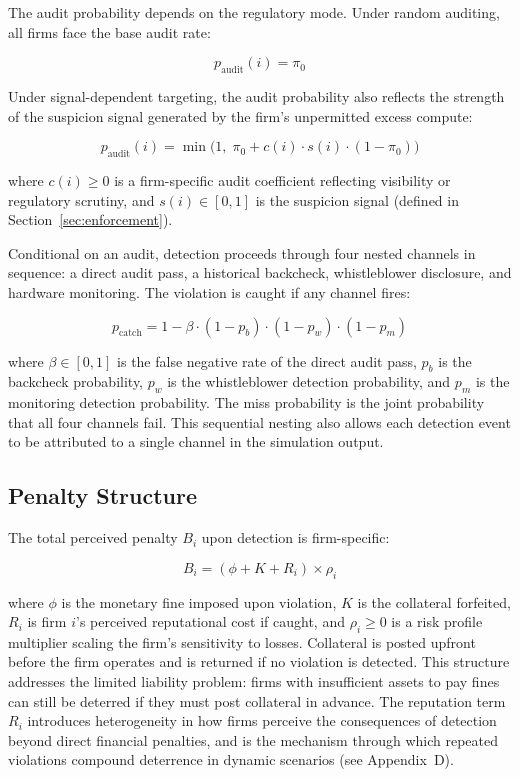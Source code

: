 The audit probability depends on the regulatory mode. Under random auditing, all firms face the base audit rate:

\begin{equation}
p_{\mathrm{audit}}(i) = \pi_0
\end{equation}

Under signal-dependent targeting, the audit probability also reflects the strength of the suspicion signal generated by the firm's unpermitted excess compute:

\begin{equation}
p_{\mathrm{audit}}(i) = \min\!\Big(1,\; \pi_0 + c(i) \cdot s(i) \cdot (1 - \pi_0)\Big)
\end{equation}

where $c(i) \geq 0$ is a firm-specific audit coefficient reflecting visibility or regulatory scrutiny, and $s(i) \in [0,1]$ is the suspicion signal (defined in Section~\ref{sec:enforcement}).

Conditional on an audit, detection proceeds through four nested channels in sequence: a direct audit pass, a historical backcheck, whistleblower disclosure, and hardware monitoring. The violation is caught if any channel fires:

\begin{equation}
p_{\mathrm{catch}} = 1 - \beta \cdot (1 - p_b) \cdot (1 - p_w) \cdot (1 - p_m)
\end{equation}

where $\beta \in [0,1]$ is the false negative rate of the direct audit pass, $p_b$ is the backcheck probability, $p_w$ is the whistleblower detection probability, and $p_m$ is the monitoring detection probability. The miss probability is the joint probability that all four channels fail. This sequential nesting also allows each detection event to be attributed to a single channel in the simulation output.

\subsection{Penalty Structure}

The total perceived penalty $B_i$ upon detection is firm-specific:

\begin{equation}
B_i = (\phi + K + R_i) \times \rho_i
\end{equation}

where $\phi$ is the monetary fine imposed upon violation, $K$ is the collateral forfeited, $R_i$ is firm $i$'s perceived reputational cost if caught, and $\rho_i \geq 0$ is a risk profile multiplier scaling the firm's sensitivity to losses. Collateral is posted upfront before the firm operates and is returned if no violation is detected. This structure addresses the limited liability problem: firms with insufficient assets to pay fines can still be deterred if they must post collateral in advance. The reputation term $R_i$ introduces heterogeneity in how firms perceive the consequences of detection beyond direct financial penalties, and is the mechanism through which repeated violations compound deterrence in dynamic scenarios (see Appendix~D).

